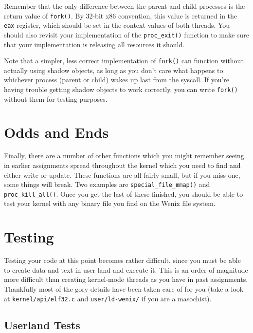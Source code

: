 Remember that the only difference between the parent and child processes is the return value of \texttt{fork()}. By 32-bit x86 convention, this value is returned in the \texttt{eax} register, which should be set in the context values of both threads. You should also revisit your implementation of the \texttt{proc\_exit()} function to make sure that your implementation is releasing all resources it should.

Note that a simpler, less correct implementation of \texttt{fork()} can function without actually using shadow objects, as long as you don't care what happens to whichever process (parent or child) wakes up last from the syscall. If you're having trouble getting shadow objects to work correctly, you can write \texttt{fork()} without them for testing purposes.

\section{Odds and Ends}

Finally, there are a number of other functions which you might remember seeing in earlier assignments spread throughout the kernel which you need to find and either write or update. These functions are all fairly small, but if you miss one, some things will break. Two examples are \texttt{special\_file\_mmap()} and \texttt{proc\_kill\_all()}. Once you get the last of these finished, you should be able to test your kernel with any binary file you find on the Wenix file system.

\section{Testing}

Testing your code at this point becomes rather difficult, since you must be able to create data and text in user land and execute it. This is an order of magnitude more difficult than creating kernel-mode threads as you have in past assignments. Thankfully most of the gory details have been taken care of for you (take a look at \texttt{kernel/api/elf32.c} and \texttt{user/ld-wenix/} if you are a masochist).

\subsection{Userland Tests}

